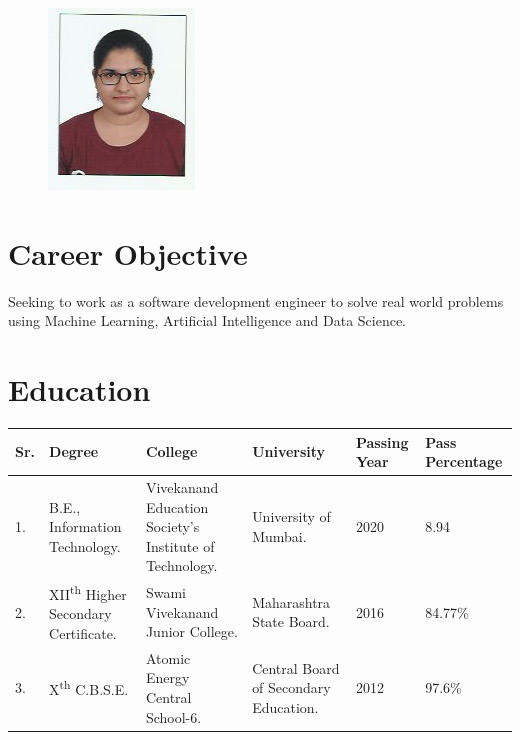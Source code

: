 \documentclass[margin]{res}
\begin{document}
\newcommand{\ts}{\textsuperscript} 

\address{{\bf Address} \\91-A, Kamgar Nagar \\ Kurla East \\ Mumbai-400024}
\address{{\bf Contact Details} \\Mob: +91-9920697529 \\ Email: gayatri.belapurkar5@gmail.com}

\begin{resume}

\begin{figure}[h!]
    \includegraphics[scale=0.5]{Photo_gayatri.jpeg}
\end{figure}

\section{Career Objective}
Seeking to work as a software development engineer to solve real world problems using Machine Learning, Artificial Intelligence and Data Science.

\section{Education}
\begin{table}[h!]
  \begin{tabular}{p{0.5cm}|p{4cm}|p{3.5cm}|p{2cm}|p{1.5cm}|p{1.6cm}}
    \textbf{Sr.} & \textbf{Degree} & \textbf{College} & \textbf{University} & \textbf{Passing Year} & \textbf{Pass Percentage} \\
    \hline
    1. & B.E., Information Technology. & Vivekanand Education Society's Institute of Technology. & University of Mumbai. & 2020 & 8.94\\
    2. & XII\ts{th} Higher Secondary Certificate. & Swami Vivekanand Junior College. & Maharashtra State Board. & 2016 & 84.77\%\\
    3. & X\ts{th }C.B.S.E. & Atomic Energy Central School-6. & Central Board of Secondary Education. & 2012 &  97.6\%\\
    \end{tabular}
\end{table}


\end{resume}
\end{document}
